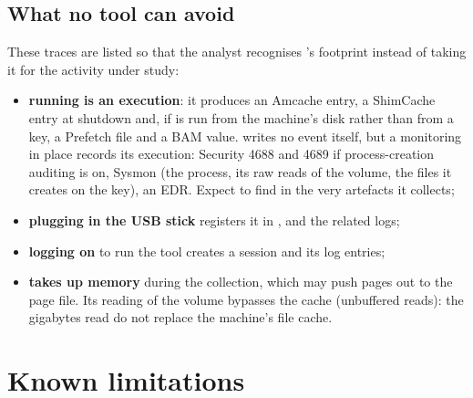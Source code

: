 \documentclass[11pt,a4paper,oneside]{report}
\begin{document}
\section{What no tool can avoid}

These traces are listed so that the analyst recognises \wac{}'s footprint
instead of taking it for the activity under study:

\begin{itemize}
  \item \textbf{running  is an execution}: it produces an
        Amcache entry, a ShimCache entry at shutdown and, if \wac{} is run
        from the machine's disk rather than from a key, a Prefetch file and a
        BAM value. \wac{} writes no event itself, but a monitoring in place
        records its execution: Security 4688 and 4689 if process-creation
        auditing is on, Sysmon (the process, its raw reads of the volume, the
        files it creates on the key), an EDR. Expect to find \wac{} in the very
        artefacts it collects;
  \item \textbf{plugging in the USB stick} registers it in ,
         and the related logs;
  \item \textbf{logging on} to run the tool creates a session and its log
        entries;
  \item \wac{} \textbf{takes up memory} during the collection, which may push
        pages out to the page file. Its reading of the volume bypasses the
        cache (unbuffered reads): the gigabytes read do not replace the
        machine's file cache.
\end{itemize}

\chapter{Known limitations}
\end{document}
